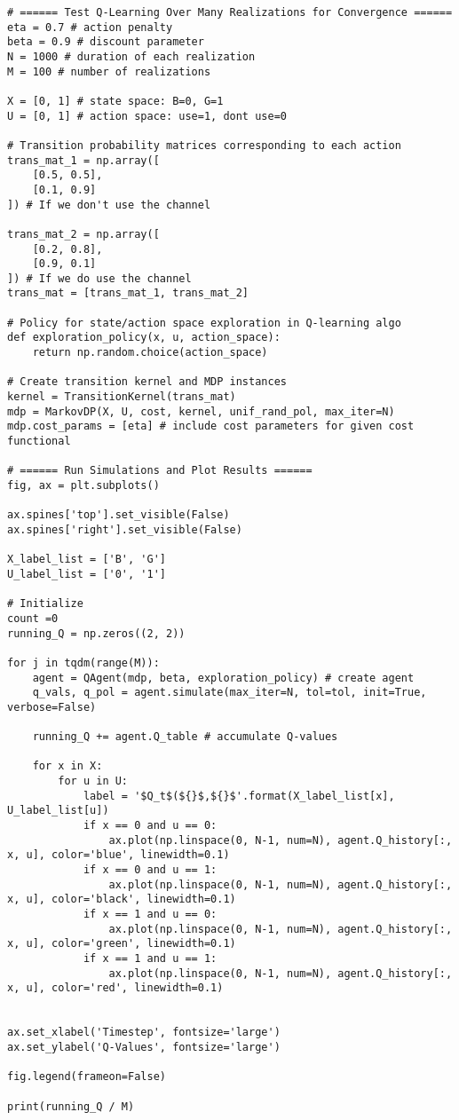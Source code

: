 \documentclass[10pt]{article}
\newcommand{\1}[1]{\mathbbm{1}_{#1}}
\begin{document}
    \begin{verbatim}
# ====== Test Q-Learning Over Many Realizations for Convergence ====== 
eta = 0.7 # action penalty
beta = 0.9 # discount parameter
N = 1000 # duration of each realization
M = 100 # number of realizations

X = [0, 1] # state space: B=0, G=1
U = [0, 1] # action space: use=1, dont use=0

# Transition probability matrices corresponding to each action
trans_mat_1 = np.array([
    [0.5, 0.5],
    [0.1, 0.9]
]) # If we don't use the channel

trans_mat_2 = np.array([
    [0.2, 0.8],
    [0.9, 0.1]
]) # If we do use the channel
trans_mat = [trans_mat_1, trans_mat_2]

# Policy for state/action space exploration in Q-learning algo
def exploration_policy(x, u, action_space):
    return np.random.choice(action_space)

# Create transition kernel and MDP instances
kernel = TransitionKernel(trans_mat)
mdp = MarkovDP(X, U, cost, kernel, unif_rand_pol, max_iter=N)
mdp.cost_params = [eta] # include cost parameters for given cost functional

# ====== Run Simulations and Plot Results ======
fig, ax = plt.subplots()

ax.spines['top'].set_visible(False)
ax.spines['right'].set_visible(False)

X_label_list = ['B', 'G']
U_label_list = ['0', '1']

# Initialize
count =0
running_Q = np.zeros((2, 2))

for j in tqdm(range(M)):
    agent = QAgent(mdp, beta, exploration_policy) # create agent
    q_vals, q_pol = agent.simulate(max_iter=N, tol=tol, init=True, verbose=False) 

    running_Q += agent.Q_table # accumulate Q-values

    for x in X:
        for u in U:
            label = '$Q_t$(${}$,${}$'.format(X_label_list[x], U_label_list[u])
            if x == 0 and u == 0:
                ax.plot(np.linspace(0, N-1, num=N), agent.Q_history[:, x, u], color='blue', linewidth=0.1)
            if x == 0 and u == 1:
                ax.plot(np.linspace(0, N-1, num=N), agent.Q_history[:, x, u], color='black', linewidth=0.1)
            if x == 1 and u == 0:
                ax.plot(np.linspace(0, N-1, num=N), agent.Q_history[:, x, u], color='green', linewidth=0.1)
            if x == 1 and u == 1:
                ax.plot(np.linspace(0, N-1, num=N), agent.Q_history[:, x, u], color='red', linewidth=0.1)


ax.set_xlabel('Timestep', fontsize='large')
ax.set_ylabel('Q-Values', fontsize='large')

fig.legend(frameon=False)

print(running_Q / M)
    \end{verbatim}
\end{document}
